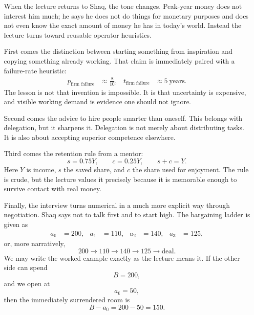 When the lecture returns to Shaq, the tone changes. Peak-year money does not interest him much; he says he does not do things for monetary purposes and does not even know the exact amount of money he has in today's world. Instead the lecture turns toward reusable operator heuristics.

First comes the distinction between starting something from inspiration and copying something already working. That claim is immediately paired with a failure-rate heuristic:
\begin{align}
p_{\text{firm failure}} &\approx \frac{8}{10}, &
t_{\text{firm failure}} &\approx 5\ \text{years}.
\end{align}
The lesson is not that invention is impossible. It is that uncertainty is expensive, and visible working demand is evidence one should not ignore.

Second comes the advice to hire people smarter than oneself. This belongs with delegation, but it sharpens it. Delegation is not merely about distributing tasks. It is also about accepting superior competence elsewhere.

Third comes the retention rule from a mentor:
\begin{equation}
s = 0.75Y,\qquad c = 0.25Y,\qquad s+c=Y.
\end{equation}
Here \(Y\) is income, \(s\) the saved share, and \(c\) the share used for enjoyment. The rule is crude, but the lecture values it precisely because it is memorable enough to survive contact with real money.

Finally, the interview turns numerical in a much more explicit way through negotiation. Shaq says not to talk first and to start high. The bargaining ladder is given as
\begin{align}
a_0&=200, &
a_1&=110, &
a_2&=140, &
a_3&=125,
\end{align}
or, more narratively,
\begin{equation}
200 \to 110 \to 140 \to 125 \to \text{deal}.
\end{equation}
We may write the worked example exactly as the lecture means it. If the other side can spend
\begin{equation}
B=200,
\end{equation}
and we open at
\begin{equation}
a_0=50,
\end{equation}
then the immediately surrendered room is
\begin{equation}
B-a_0 = 200-50 = 150.
\end{equation}

